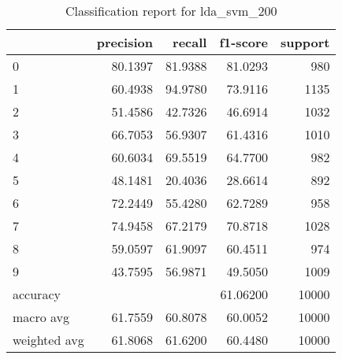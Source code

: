\begin{table}[htb!]
\centering
\begin{tabular}{lrrrr}
    \toprule
 & precision & recall & f1-score & support \\
\midrule
0 & 80.1397 & 81.9388 & 81.0293 & 980 \\
1 & 60.4938 & 94.9780 & 73.9116 & 1135 \\
2 & 51.4586 & 42.7326 & 46.6914 & 1032 \\
3 & 66.7053 & 56.9307 & 61.4316 & 1010 \\
4 & 60.6034 & 69.5519 & 64.7700 & 982 \\
5 & 48.1481 & 20.4036 & 28.6614 & 892 \\
6 & 72.2449 & 55.4280 & 62.7289 & 958 \\
7 & 74.9458 & 67.2179 & 70.8718 & 1028 \\
8 & 59.0597 & 61.9097 & 60.4511 & 974 \\
9 & 43.7595 & 56.9871 & 49.5050 & 1009 \\
accuracy & & & 61.06200 & 10000 \\
macro avg & 61.7559 & 60.8078 & 60.0052 & 10000 \\
weighted avg & 61.8068 & 61.6200 & 60.4480 & 10000 \\
\bottomrule
\end{tabular}
\caption{Classification report for lda_svm_200}
\label{tab:classification-report-lda_svm_200}
\end{table}
